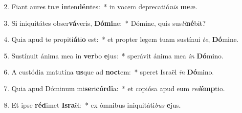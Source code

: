 2. Fiant aures tuæ \textbf{in}ten\textbf{dén}tes:~*  in vocem deprecatió\textit{nis} \textbf{me}æ.\

3. Si iniquitátes obser\textbf{vá}veris, \textbf{Dó}\textbf{mi}ne:~*  Dómine, quis sus\textit{ti}\textbf{né}bit?\

4. Quia apud te propiti\textbf{á}ti\textbf{o} est:~*  et propter legem tuam sustínui \textit{te}, \textbf{Dó}mine.\

5. Sustínuit ánima mea in \textbf{ver}bo \textbf{e}jus:~*  sperávit ánima mea \textit{in} \textbf{Dó}mino.\

6. A custódia matutína \textbf{us}que ad \textbf{noc}tem:~*  speret Israël \textit{in} \textbf{Dó}mino.\

7. Quia apud Dóminum mi\textbf{se}ri\textbf{cór}\textbf{di}a:~*  et copiósa apud eum \textit{red}\textbf{émp}tio.\

8. Et ipse \textbf{réd}imet \textbf{Is}\textbf{ra}ël:~*  ex ómnibus iniquitáti\textit{bus} \textbf{e}jus.\

